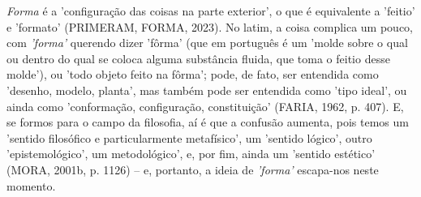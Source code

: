 \documentclass[twoside, 12pt, english,italian,latin,greek,french,spanish,brazil]{book}
\begin{document}
    \textit{Forma} é a 'configuração das coisas na parte exterior', o que é equivalente a 'feitio' e 'formato' (PRIMERAM, FORMA, 2023). No latim, a coisa complica um pouco, com \textit{'forma'} querendo dizer 'fôrma' (que em português é um 'molde sobre o qual ou dentro do qual se coloca alguma substância fluida, que toma o feitio desse molde'), ou 'todo objeto feito na fôrma'; pode, de fato, ser entendida como 'desenho, modelo, planta', mas também pode ser entendida como 'tipo ideal', ou ainda como 'conformação, configuração, constituição' (FARIA, 1962, p. 407). E, se formos para o campo da filosofia, aí é que a confusão aumenta, pois temos um 'sentido filosófico e particularmente metafísico', um 'sentido lógico', outro 'epistemológico', um metodológico', e, por fim, ainda um 'sentido estético' (MORA, 2001b, p. 1126) – e, portanto, a ideia de \textit{'forma'} escapa-nos neste momento.
\end{document}
